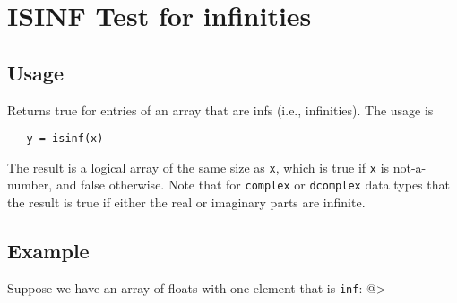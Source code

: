 \section{ISINF Test for infinities}

\subsection{Usage}

Returns true for entries of an array that are infs (i.e.,
infinities).  The usage is
\begin{verbatim}
   y = isinf(x)
\end{verbatim}
The result is a logical array of the same size as \verb|x|,
which is true if \verb|x| is not-a-number, and false otherwise.
Note that for \verb|complex| or \verb|dcomplex| data types that
the result is true if either the real or imaginary parts
are infinite.
\subsection{Example}

Suppose we have an array of floats with one element that
is \verb|inf|:
@>

